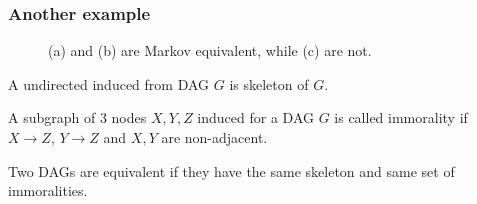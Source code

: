 \documentclass[10pt]{beamer}
\begin{document}
\begin{frame}
\frametitle{Another example}
\begin{figure}
    \centering
    \begin{subfigure}{0.2\textwidth}
    \resizebox{0.8\textwidth}{!} {
    }
    \subcaption{ }
    \label{fig:markov_equiv_1}
    \end{subfigure}
    \begin{subfigure}{0.2\textwidth}
    \subcaption{ }
    \label{fig:markov_equiv_2}
    \end{subfigure}
    \begin{subfigure}{0.2\textwidth}
    \subcaption{ }
    \label{fig:markov_equiv_2}
    \end{subfigure}
    \caption{(a) and (b) are Markov equivalent, while (c) are not.}
\end{figure}
\begin{definition}[Skeleton]
    A undirected induced from DAG $G$ is skeleton of  $G$.
\end{definition}
\begin{definition}[Immorality]
    A subgraph of 3 nodes $X, Y, Z$ induced for a DAG $G$  is called immorality if $X \rightarrow Z$,  $Y \rightarrow Z$ and $X, Y$ are non-adjacent.
\end{definition}
    
\begin{theorem}
    Two DAGs are equivalent if they have the same skeleton and same set of immoralities.
\end{theorem}
\end{frame}
\end{document}
